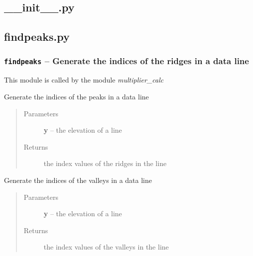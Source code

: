 \documentclass[letterpaper,10pt,english]{sphinxmanual}
\begin{document}
\subsection{\_\_init\_\_.py}
\label{docs/topographic:init-py}\label{docs/topographic:module-__init__}

\subsection{findpeaks.py}
\label{docs/topographic:module-findpeaks}\label{docs/topographic:findpeaks-py}

\subsubsection{\texttt{findpeaks} -- Generate the indices of the ridges in a data line}
\label{docs/topographic:findpeaks-generate-the-indices-of-the-ridges-in-a-data-line}
This module is called by the module \emph{multiplier\_calc}


\begin{fulllineitems}
\label{docs/topographic:findpeaks.findpeaks}
Generate the indices of the peaks in a data line
\begin{quote}\begin{description}
\item[{Parameters}] \leavevmode
\textbf{y} --  the elevation of a line

\item[{Returns}] \leavevmode
{} the index values of the ridges in the line

\end{description}\end{quote}

\end{fulllineitems}



\begin{fulllineitems}
\label{docs/topographic:findpeaks.findvalleys}
Generate the indices of the valleys in a data line
\begin{quote}\begin{description}
\item[{Parameters}] \leavevmode
\textbf{y} --  the elevation of a line

\item[{Returns}] \leavevmode
{} the index values of the valleys in the line

\end{description}\end{quote}

\end{fulllineitems}
\end{document}
